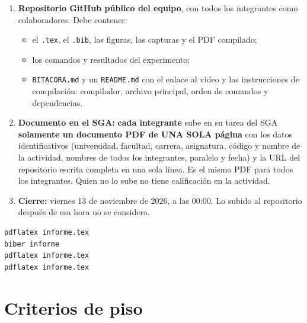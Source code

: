 \documentclass[11pt,a4paper]{article}
\begin{document}
\begin{enumerate}
	\item \textbf{Repositorio GitHub público del equipo}, con todos los integrantes como colaboradores. Debe contener:
	\begin{itemize}
		\item el \texttt{.tex}, el \texttt{.bib}, las figuras, las capturas y el PDF compilado;
		\item los comandos y resultados del experimento;
		\item \texttt{BITACORA.md} y un \texttt{README.md} con el enlace al video y las instrucciones de compilación: compilador, archivo principal, orden de comandos y dependencias.
	\end{itemize}
	\item \textbf{Documento en el SGA:} \textbf{cada integrante} sube en su tarea del SGA \textbf{solamente un documento PDF de UNA SOLA página} con los datos identificativos (universidad, facultad, carrera, asignatura, código y nombre de la actividad, nombres de todos los integrantes, paralelo y fecha) y la URL del repositorio escrita completa en una sola línea. Es el mismo PDF para todos los integrantes. Quien no lo sube no tiene calificación en la actividad.
	\item \textbf{Cierre:} viernes 13 de noviembre de 2026, a las 00:00. Lo subido al repositorio después de esa hora no se considera.
\end{enumerate}

\begin{lstlisting}
pdflatex informe.tex
biber informe
pdflatex informe.tex
pdflatex informe.tex
\end{lstlisting}

\section{Criterios de piso}\label{sec:piso}
\end{document}
